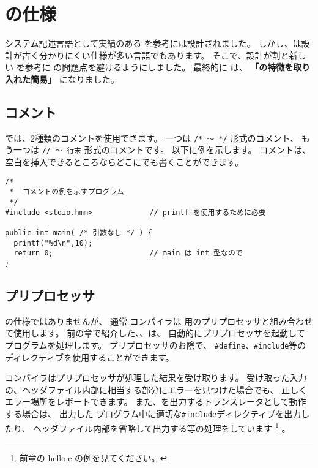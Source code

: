 % 
%
\chapter{\cmml の仕様}

システム記述言語として実績のある \cl を参考に\cmml は設計されました。
しかし、\cl は設計が古く分かりにくい仕様が多い言語でもあります。
そこで、設計が割と新しい \javal を参考に \cl の問題点を避けるようにしました。
最終的に \cmml は、
{\bf 「\javal の特徴を取り入れた簡易\cl」} になりました。

\section{コメント}

\cmml では、2種類のコメントを使用できます。
一つは \verb!/* 〜 */! 形式のコメント、
もう一つは \verb!// 〜 行末! 形式のコメントです。
以下に例を示します。
コメントは、空白を挿入できるところならどこにでも書くことができます。

\begin{mylist}
\begin{verbatim}
/*
 *  コメントの例を示すプログラム
 */
#include <stdio.hmm>             // printf を使用するために必要

public int main( /* 引数なし */ ) {
  printf("%d\n",10);
  return 0;                      // main は int 型なので
}
\end{verbatim}
\end{mylist}

\section{プリプロセッサ}

\cmml の仕様ではありませんが、
通常 \cmm コンパイラは \cl 用のプリプロセッサと組み合わせて使用します。
前の章で紹介した{\cme}、{\cmc}、{\cmv}は、
自動的にプリプロセッサを起動して{\cmm}プログラムを処理します。
プリプロセッサのお陰で、
\verb/#define/、\verb/#include/等のディレクティブを使用することができます。

\cmm コンパイラはプリプロセッサが処理した結果を受け取ります。
受け取った入力の、ヘッダファイル内部に相当する部分にエラーを見つけた場合でも、
正しくエラー場所をレポートできます。
また、\cl を出力するトランスレータとして動作する場合は、
出力した \cl プログラム中に適切な\verb/#include/ディレクティブを出力したり、
ヘッダファイル内部を省略して出力する等の処理をしています
\footnote{前章の hello.c の例を見てください。}
。

